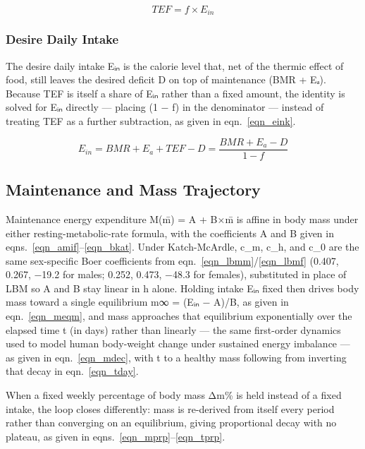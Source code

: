\begin{equation}
\label{eqn_tefq}
TEF = f × E_{in}
\end{equation}

\subsubsection{Desire Daily Intake}

The desire daily intake Eᵢₙ is the calorie level that, net of the thermic effect of food, still leaves the desired deficit D on top of maintenance (BMR + Eₐ). Because TEF is itself a share of Eᵢₙ rather than a fixed amount, the identity is solved for Eᵢₙ directly — placing (1 − f) in the denominator — instead of treating TEF as a further subtraction, as given in eqn.~\eqref{eqn_eink}.

\begin{equation}
\label{eqn_eink}
E_{in} = BMR + E_{a} + TEF − D = \frac{BMR + E_{a} − D}{1 − f}
\end{equation}

\subsection{Maintenance and Mass Trajectory}

Maintenance energy expenditure M(m̄) = A + B×m̄ is affine in body mass under either resting-metabolic-rate formula, with the coefficients A and B given in eqns.~\eqref{eqn_amif}–\eqref{eqn_bkat}. Under Katch-McArdle, c\_m, c\_h, and c\_0 are the same sex-specific Boer coefficients from eqn.~\eqref{eqn_lbmm}/\eqref{eqn_lbmf} (0.407, 0.267, −19.2 for males; 0.252, 0.473, −48.3 for females), substituted in place of LBM so A and B stay linear in h alone. Holding intake Eᵢₙ fixed then drives body mass toward a single equilibrium m∞ = (Eᵢₙ − A)/B, as given in eqn.~\eqref{eqn_meqm}, and mass approaches that equilibrium exponentially over the elapsed time t (in days) rather than linearly — the same first-order dynamics used to model human body-weight change under sustained energy imbalance \cite{ref_chow2008} — as given in eqn.~\eqref{eqn_mdec}, with t to a healthy mass following from inverting that decay in eqn.~\eqref{eqn_tday}.

When a fixed weekly percentage of body mass Δm\% is held instead of a fixed intake, the loop closes differently: mass is re-derived from itself every period rather than converging on an equilibrium, giving proportional decay with no plateau, as given in eqns.~\eqref{eqn_mprp}–\eqref{eqn_tprp}.

